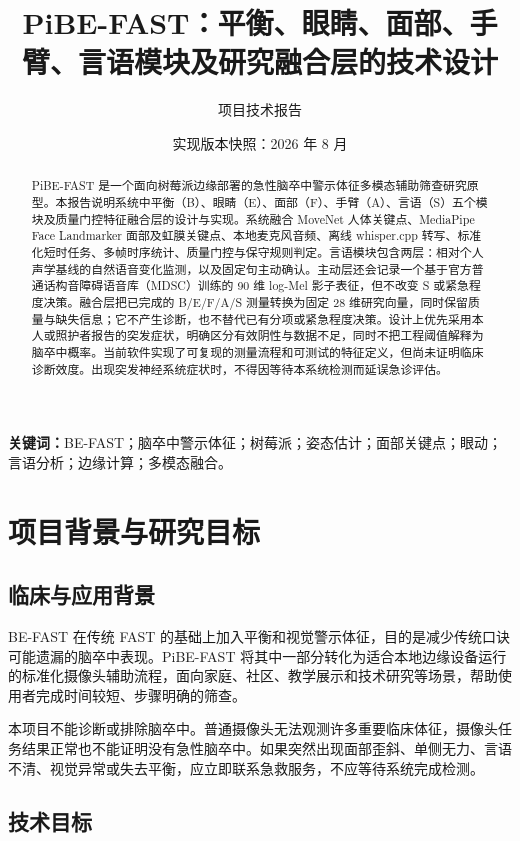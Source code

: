 \documentclass[11pt,a4paper]{article}
\title{\textbf{PiBE-FAST：平衡、眼睛、面部、手臂、言语模块及研究融合层的技术设计}}
\author{项目技术报告}
\date{实现版本快照：2026 年 8 月}
\begin{document}
\maketitle

\begin{abstract}
PiBE-FAST 是一个面向树莓派边缘部署的急性脑卒中警示体征多模态辅助筛查研究原型。本报告说明系统中平衡（B）、眼睛（E）、面部（F）、手臂（A）、言语（S）五个模块及质量门控特征融合层的设计与实现。系统融合 MoveNet 人体关键点、MediaPipe Face Landmarker 面部及虹膜关键点、本地麦克风音频、离线 whisper.cpp 转写、标准化短时任务、多帧时序统计、质量门控与保守规则判定。言语模块包含两层：相对个人声学基线的自然语音变化监测，以及固定句主动确认。主动层还会记录一个基于官方普通话构音障碍语音库（MDSC）训练的 90 维 log-Mel 影子表征，但不改变 S 或紧急程度决策。融合层把已完成的 B/E/F/A/S 测量转换为固定 28 维研究向量，同时保留质量与缺失信息；它不产生诊断，也不替代已有分项或紧急程度决策。设计上优先采用本人或照护者报告的突发症状，明确区分有效阴性与数据不足，同时不把工程阈值解释为脑卒中概率。当前软件实现了可复现的测量流程和可测试的特征定义，但尚未证明临床诊断效度。出现突发神经系统症状时，不得因等待本系统检测而延误急诊评估。
\end{abstract}

\textbf{关键词：}BE-FAST；脑卒中警示体征；树莓派；姿态估计；面部关键点；眼动；言语分析；边缘计算；多模态融合。

\tableofcontents
\newpage

\section{项目背景与研究目标}

\subsection{临床与应用背景}

BE-FAST 在传统 FAST 的基础上加入平衡和视觉警示体征，目的是减少传统口诀可能遗漏的脑卒中表现\cite{aroor2017befast}。PiBE-FAST 将其中一部分转化为适合本地边缘设备运行的标准化摄像头辅助流程，面向家庭、社区、教学展示和技术研究等场景，帮助使用者完成时间较短、步骤明确的筛查。

本项目不能诊断或排除脑卒中。普通摄像头无法观测许多重要临床体征，摄像头任务结果正常也不能证明没有急性脑卒中。如果突然出现面部歪斜、单侧无力、言语不清、视觉异常或失去平衡，应立即联系急救服务，不应等待系统完成检测。

\subsection{技术目标}
\end{document}
